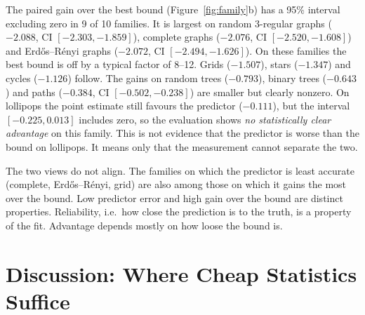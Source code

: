 \documentclass{article}
\begin{document}
The paired gain over the best bound (Figure~\ref{fig:family}b) has a 95\% interval excluding zero in 9 of 10 families. %
It is largest on random 3-regular graphs ($-2.088$, CI $[-2.303,-1.859]$), complete graphs ($-2.076$, CI $[-2.520,-1.608]$) and Erd\H{o}s--R\'enyi graphs ($-2.072$, CI $[-2.494,-1.626]$). %
On these families the best bound is off by a typical factor of 8--12. Grids ($-1.507$), stars ($-1.347$) and cycles ($-1.126$) follow. %
The gains on random trees ($-0.793$), binary trees ($-0.643$) and paths ($-0.384$, CI $[-0.502,-0.238]$) are smaller but clearly nonzero. %
On lollipops the point estimate still favours the predictor ($-0.111$), but the interval $[-0.225, 0.013]$ includes zero, so the evaluation shows \emph{no statistically clear advantage} on this family. %
This is not evidence that the predictor is worse than the bound on lollipops. It means only that the measurement cannot separate the two.

The two views do not align. The families on which the predictor is least accurate (complete, Erd\H{o}s--R\'enyi, grid) are also among those on which it gains the most over the bound. Low predictor error and high gain over the bound are distinct properties. Reliability, i.e.\ how close the prediction is to the truth, is a property of the fit. Advantage depends mostly on how loose the bound is.

\section{Discussion: Where Cheap Statistics Suffice}
\label{sec:discussion}
\end{document}
